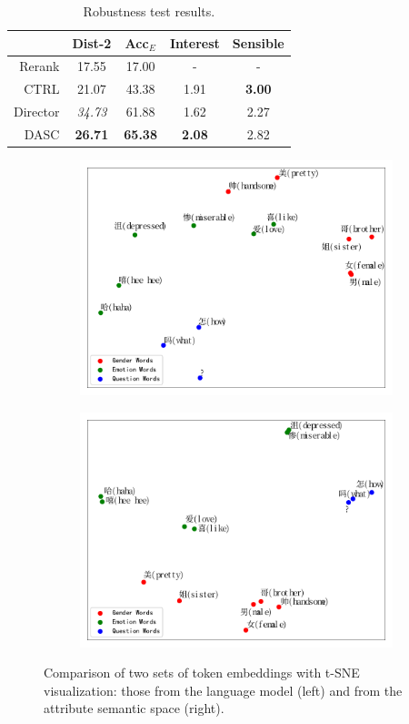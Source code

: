 \begin{table}[th]
    \small
    \centering
    \begin{tabular}{r|cc|cc}
    \hline
             & Dist-2         & Acc$_E$            & Interest      & Sensible      \\ \hline
    Rerank   & 17.55          & 17.00          & -             & -             \\
    CTRL     & 21.07          & 43.38          & 1.91          & \textbf{3.00} \\
    Director & \textit{34.73} & 61.88          & 1.62          & 2.27             \\
    DASC     & \textbf{26.71} & \textbf{65.38} & \textbf{2.08} & 2.82 \\ \hline
    \end{tabular}
    \caption{Robustness test results.}
    \label{tab:robustness}
\end{table}

\begin{figure}[t]
    \centering
    \begin{subfigure}{}
        \centering
        \includegraphics[width=.48\linewidth]{figures/tsne_sub_plot_token_emb2.pdf}  
    \end{subfigure}
    \begin{subfigure}{}
        \centering
        \includegraphics[width=.48\linewidth]{figures/tsne_sub_plot2.pdf}  
    \end{subfigure}
    \caption{Comparison of two sets of token embeddings with t-SNE visualization: those from the language model (left) and from the attribute semantic space (right).}
    \label{fig:token_emb}
\end{figure}

